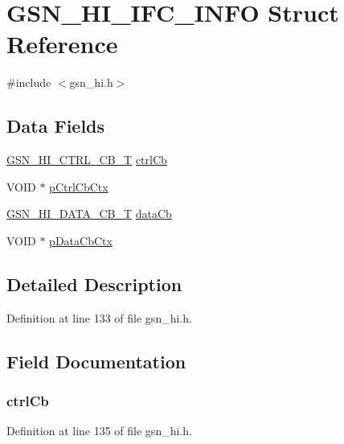 \hypertarget{a00086}{
\section{GSN\_\-HI\_\-IFC\_\-INFO Struct Reference}
\label{a00086}
}


{\ttfamily \#include $<$gsn\_\-hi.h$>$}

\subsection*{Data Fields}
\begin{DoxyCompactItemize}
\item 
\hyperlink{a00504_a9943ae3de497f108841d00f0b80ff390}{GSN\_\-HI\_\-CTRL\_\-CB\_\-T} \hyperlink{a00086_aa442cd2da00312533e65bc43814eee7b}{ctrlCb}
\item 
VOID $\ast$ \hyperlink{a00086_ad5ece2cca5793c5c804c56153c57be66}{pCtrlCbCtx}
\item 
\hyperlink{a00504_a01ca163707bf2c00971f4e2a9b96fb46}{GSN\_\-HI\_\-DATA\_\-CB\_\-T} \hyperlink{a00086_ab5e0c9ef2bdc4d0e354528b1080f21bc}{dataCb}
\item 
VOID $\ast$ \hyperlink{a00086_aaac1b748e9426eb856106f9227f7634d}{pDataCbCtx}
\end{DoxyCompactItemize}


\subsection{Detailed Description}


Definition at line 133 of file gsn\_\-hi.h.



\subsection{Field Documentation}
\hypertarget{a00086_aa442cd2da00312533e65bc43814eee7b}{
\subsubsection[{ctrlCb}]{ {\bf ctrlCb}}}
\label{a00086_aa442cd2da00312533e65bc43814eee7b}


Definition at line 135 of file gsn\_\-hi.h.

